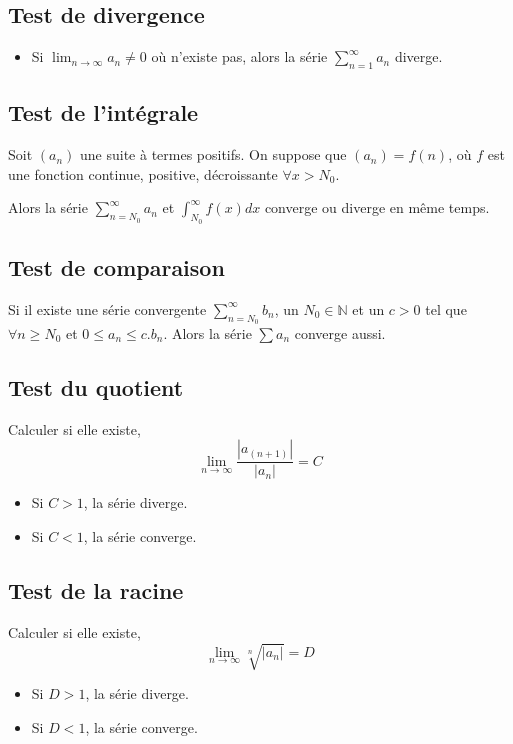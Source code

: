 \subsection{Test de divergence}
\begin{itemize}
  \item Si $\lim_{n \to \infty}a_n \neq 0$ où n'existe pas,
    alors la série $\sum_{n = 1}^{\infty}a_n$ diverge.
\end{itemize}

\subsection{Test de l'intégrale}
Soit $(a_n)$ une suite à termes positifs.
On suppose que $(a_n) = f(n)$, où $f$ est une fonction continue,
positive, décroissante $\forall x > N_0$.

Alors la série $\sum_{n =N_0}^{\infty} a_n$ et
$\int_{N_0}^{\infty} f(x) dx$ converge ou diverge en même temps.

\subsection{Test de comparaison}
Si il existe une série convergente $\sum_{n =N_0}^{\infty} b_n$,
un $N_0 \in \mathbb{N}$ et un $c > 0$ tel que
$\forall n \geq N_0$ et $0 \leq a_n \leq c.b_n$.
Alors la série $\sum a_n$ converge aussi.

\subsection{Test du quotient}
Calculer si elle existe,
\[ \lim_{n \to \infty} \frac{|a_{(n+1)}|}{|a_n|} = C \]
\begin{itemize}
  \item Si $C > 1$, la série diverge.
  \item Si $C < 1$, la série converge.
\end{itemize}
\subsection{Test de la racine}
Calculer si elle existe,
\[ \lim_{n \to \infty} \sqrt[n]{|a_n|} = D \]
\begin{itemize}
  \item Si $D > 1$, la série diverge.
  \item Si $D < 1$, la série converge.
\end{itemize}



